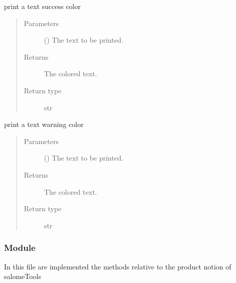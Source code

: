\documentclass[a4paper,10pt,english]{sphinxmanual}
\begin{document}
\begin{fulllineitems}
\label{\detokenize{commands/apidoc/src:src.printcolors.printcSuccess}}
print a text success color
\begin{quote}\begin{description}
\item[{Parameters}] \leavevmode
{} () \textendash{} The text to be printed.

\item[{Returns}] \leavevmode
The colored text.

\item[{Return type}] \leavevmode
str

\end{description}\end{quote}

\end{fulllineitems}


\begin{fulllineitems}
\label{\detokenize{commands/apidoc/src:src.printcolors.printcWarning}}
print a text warning color
\begin{quote}\begin{description}
\item[{Parameters}] \leavevmode
{} () \textendash{} The text to be printed.

\item[{Returns}] \leavevmode
The colored text.

\item[{Return type}] \leavevmode
str

\end{description}\end{quote}

\end{fulllineitems}



\subsubsection{ Module}
\label{\detokenize{commands/apidoc/src:module-src.product}}\label{\detokenize{commands/apidoc/src:product-module}}
In this file are implemented the methods 
relative to the product notion of salomeTools
\end{document}
